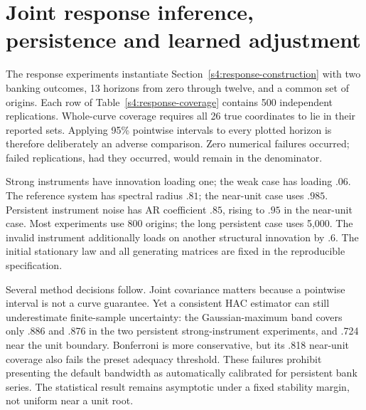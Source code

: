 \section{Joint response inference, persistence and learned adjustment}
\label{s4:response-results}
The response experiments instantiate Section~\ref{s4:response-construction}
with two banking outcomes, 13 horizons from zero through twelve, and a
common set of origins. Each row of Table~\ref{s4:response-coverage} contains
500 independent replications. Whole-curve coverage requires all 26 true
coordinates to lie in their reported sets. Applying 95\% pointwise intervals
to every plotted horizon is therefore deliberately an adverse comparison.
Zero numerical failures occurred; failed replications, had they occurred,
would remain in the denominator.

\begin{table}[htbp]\centering\small

\caption{Whole-curve coverage of nominal 95\% procedures. ``Joint'' uses
Bonferroni; ``max'' uses the estimated Gaussian maximum; ``IV set'' inverts
the joint residual tests. Standard Monte Carlo errors near .95 are about
.010. These are synthetic experiments, not coverage guarantees.}
\label{s4:response-coverage}
\end{table}

Strong instruments have innovation loading one; the weak case has loading
$.06$. The reference system has spectral radius $.81$; the near-unit case
uses $.985$. Persistent instrument noise has AR coefficient $.85$, rising
to $.95$ in the near-unit case. Most experiments use 800 origins; the long
persistent case uses 5,000. The invalid instrument additionally loads on
another structural innovation by $.6$. The initial stationary law and
all generating matrices are fixed in the reproducible specification.

Several method decisions follow. Joint covariance matters because a
pointwise interval is not a curve guarantee. Yet a consistent HAC estimator
can still underestimate finite-sample uncertainty: the Gaussian-maximum
band covers only .886 and .876 in the two persistent strong-instrument
experiments, and .724 near the unit boundary. Bonferroni is more conservative,
but its .818 near-unit coverage also fails the preset adequacy threshold.
These failures prohibit presenting the default bandwidth as automatically
calibrated for persistent bank series. The statistical result remains
asymptotic under a fixed stability margin, not uniform near a unit root.

